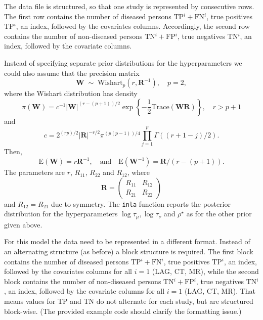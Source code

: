 \documentclass[a4paper,11pt]{article}
\def\mm#1{\ensuremath{\boldsymbol{#1}}} %
\begin{document}
The data file is structured, so that one study is represented by 
consecutive rows. The first row contains the number of diseased persons
$\text{TP}{^i}+\text{FN}{^i}$, true positives $\text{TP}{^i}$, an index,
followed by the covariates columns. Accordingly, the second row contains
the number of non-diseased persons $\text{TN}{^i}+\text{FP}{^i}$, 
true negatives $\text{TN}{^i}$, an index, followed by the covariate 
columns.

\clearpage
Instead of specifying separate prior distributions for the hyperparameters
we could also assume that the precision matrix
\begin{displaymath}
          \mathbf{W}\;\sim\;\text{Wishart}_{p}(r, \mm{R}^{-1}), \quad p=2,
\end{displaymath}
where the Wishart distribution has density
\begin{displaymath}
    \pi(\mathbf{W}) = c^{-1} |\mathbf{W}|^{(r-(p+1))/2} \exp\left\{
      -\frac{1}{2}\text{Trace}(\mathbf{W}\mathbf{R})\right\}, \quad r > p+1
\end{displaymath}
and
\begin{displaymath}
    c = 2^{(rp)/2} |\mathbf{R}|^{-r/2} \pi^{(p(p-1))/4}\prod_{j=1}^{p}
    \Gamma((r+1-j)/2).
\end{displaymath}
Then,
\begin{displaymath}
    \text{E}(\mathbf{W}) = r\mathbf{R}^{-1}, \quad\text{and}\quad
    \text{E}(\mathbf{W}^{-1}) = \mathbf{R}/(r-(p+1)).
\end{displaymath}
The parameters are $r$, $R_{11}$, $R_{22}$ and $R_{12}$, where
\begin{displaymath}
    \mm{R} =
    \begin{pmatrix}
        R_{11} &R_{12}\\
        R_{21} & R_{22}
    \end{pmatrix}
\end{displaymath}
and $R_{12} = R_{21}$ due to symmetry.  The {\tt inla} function reports the posterior 
distribution for the  hyperparameters $\log \tau_\mu, \log \tau_\nu$ and $\rho^\star$  
as for the other prior given above.

For this model the data need to be represented in a different format.
Instead of an alternating structure (as before) a block structure is required.
The first block contains the number of diseased persons
$\text{TP}{^i}+\text{FN}{^i}$, true positives $\text{TP}{^i}$, an index,
followed by the covariates columns for all $i=1$ (LAG, CT, MR), 
while the second block contains
the number of non-diseased persons $\text{TN}{^i}+\text{FP}{^i}$, 
true negatives $\text{TN}{^i}$, an index, followed by the covariate 
columns for all $i=1$ (LAG, CT, MR). That means values for TP and TN do not
alternate for each study, but are structured block-wise.
(The provided example code should clarify the formatting issue.)



\end{document}
